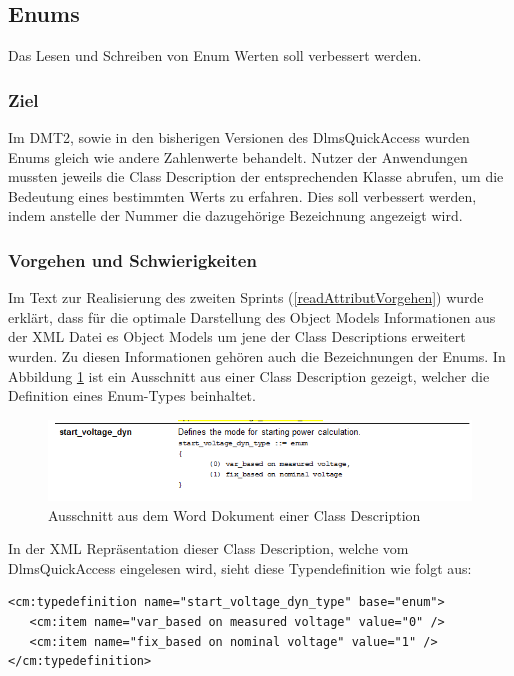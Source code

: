 \subsection{Enums}
\dq Das Lesen und Schreiben von Enum Werten soll verbessert werden.\dq
\subsubsection{Ziel}
Im \ac{DMT2}, sowie in den bisherigen Versionen des DlmsQuickAccess wurden Enums gleich wie andere Zahlenwerte behandelt.
Nutzer der Anwendungen mussten jeweils die Class Description der entsprechenden Klasse abrufen, um die Bedeutung eines bestimmten Werts zu erfahren.
Dies soll verbessert werden, indem anstelle der Nummer die dazugehörige Bezeichnung angezeigt wird.

\subsubsection{Vorgehen und Schwierigkeiten}
Im Text zur Realisierung des zweiten Sprints (\ref{readAttributVorgehen}) wurde erklärt, dass für die optimale Darstellung des Object Models Informationen aus der XML Datei es Object Models um jene der Class Descriptions erweitert wurden.
Zu diesen Informationen gehören auch die Bezeichnungen der Enums.
In Abbildung \ref{fig:enumTypedefword} ist ein Ausschnitt aus einer Class Description gezeigt, welcher die Definition eines Enum-Types beinhaltet.
\begin{figure}
   \centering
   \includegraphics[width=1.0\textwidth]{gfx/enum_typedef_word.png}
   \caption{
      Ausschnitt aus dem Word Dokument einer Class Description
      }
      \label{fig:enumTypedefword}
\end{figure}
In der XML Repräsentation dieser Class Description, welche vom DlmsQuickAccess eingelesen wird, sieht diese Typendefinition wie folgt aus:
\begin{verbatim}
<cm:typedefinition name="start_voltage_dyn_type" base="enum">
   <cm:item name="var_based on measured voltage" value="0" />
   <cm:item name="fix_based on nominal voltage" value="1" />
</cm:typedefinition>
\end{verbatim}

